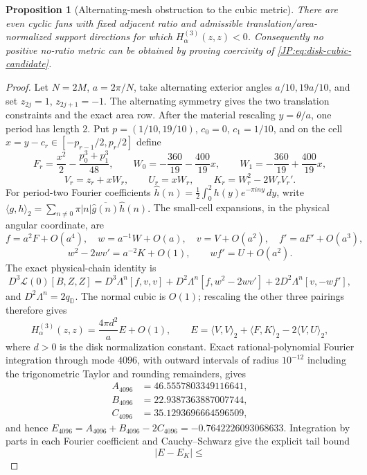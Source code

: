 \documentclass[11pt]{amsart}
\numberwithin{equation}{section}
\newtheorem{proposition}[theorem]{Proposition}
\theoremstyle{definition}
\theoremstyle{remark}
\begin{document}
\begin{proposition}[Alternating-mesh obstruction to the cubic metric]
\label{JP:prop:cubic-counterexample}
There are even cyclic fans with fixed adjacent ratio and admissible
translation/area-normalized support directions for which
$H^{(3)}_\alpha(z,z)<0$.  Consequently no positive no-ratio metric can be
obtained by proving coercivity of \eqref{JP:eq:disk-cubic-candidate}.
\end{proposition}

\begin{proof}
Let $N=2M$, $a=2\pi/N$, take alternating exterior angles
$a/10,19a/10$, and set $z_{2j}=1$, $z_{2j+1}=-1$.  The alternating
symmetry gives the two translation constraints and the exact area row.
After the material rescaling $y=\theta/a$, one period has length $2$.
Put $p=(1/10,19/10)$, $c_0=0$, $c_1=1/10$, and on the cell
$x=y-c_r\in[-p_{r-1}/2,p_r/2]$ define
\[
 F_r=\frac{x^2}{2}-\frac{p_0^3+p_1^3}{48},\qquad
 W_0=-\frac{360}{19}-\frac{400}{19}x,\qquad
 W_1=-\frac{360}{19}+\frac{400}{19}x,
\]
\[
 V_r=z_r+xW_r,\qquad U_r=xW_r,\qquad
 K_r=W_r^2-2W_rV_r'.
\]
For period-two Fourier coefficients
$\widehat h(n)=\frac12\int_0^2h(y)e^{-\pi iny}\,dy$, write
\(
 \langle g,h\rangle_2
 =\sum_{n\ne0}\pi|n|\overline{\widehat g(n)}\widehat h(n).
\)
The small-cell expansions, in the physical angular coordinate, are
\[
 f=a^2F+O(a^4),\quad w=a^{-1}W+O(a),\quad
 v=V+O(a^2),\quad f'=aF'+O(a^3),
\]
\[
 w^2-2wv'=a^{-2}K+O(1),\qquad wf'=U+O(a^2).
\]
The exact physical-chain identity is
\[
 D^3\mathcal L(0)[B,Z,Z]
 =D^3\Lambda^n[f,v,v]
  +D^2\Lambda^n[f,w^2-2wv']
  +2D^2\Lambda^n[v,-wf'],
\]
and $D^2\Lambda^n=2q_{\mathbb D}$.  The normal cubic is $O(1)$;
rescaling the other three pairings therefore gives
\[
 H^{(3)}_\alpha(z,z)=\frac{4\pi d^2}{a}E+O(1),\qquad
 E=\langle V,V\rangle_2+\langle F,K\rangle_2
       -2\langle V,U\rangle_2,
\]
where $d>0$ is the disk normalization constant.  Exact rational-polynomial
Fourier integration through mode $4096$, with outward intervals of radius
$10^{-12}$ including the trigonometric Taylor and rounding remainders,
gives
\begin{align*}
 A_{4096}&=46.5557803349116641,\\
 B_{4096}&=22.9387363887007744,\\
 C_{4096}&=35.1293696664596509,
\end{align*}
and hence $E_{4096}=A_{4096}+B_{4096}-2C_{4096}
=-0.7642226093068633$.  Integration by parts in each Fourier coefficient
and Cauchy--Schwarz give the explicit tail bound
\[
 |E-E_K|\le
\]
\end{proof}
\end{document}

